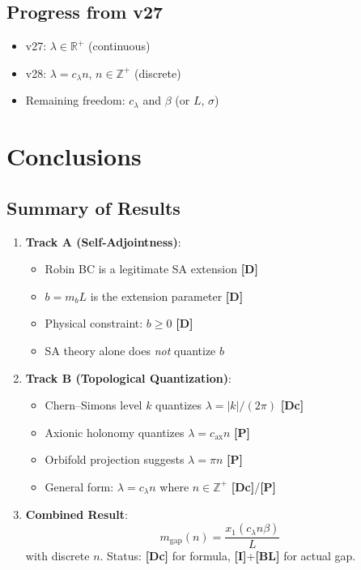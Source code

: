 \documentclass[11pt,a4paper]{article}
\newcommand{\mgap}{m_{\mathrm{gap}}}
\newcommand{\mb}{m_b}
\newcommand{\tagD}{\textbf{[D]}}
\newcommand{\tagDc}{\textbf{[Dc]}}
\newcommand{\tagI}{\textbf{[I]}}
\newcommand{\tagBL}{\textbf{[BL]}}
\newcommand{\tagP}{\textbf{[P]}}
\theoremstyle{definition}
\theoremstyle{plain}
\theoremstyle{remark}
\begin{document}
\subsection{Progress from v27}

\begin{itemize}
\item v27: $\lambda \in \mathbb{R}^+$ (continuous)
\item v28: $\lambda = c_\lambda n$, $n \in \mathbb{Z}^+$ (discrete)
\item Remaining freedom: $c_\lambda$ and $\beta$ (or $L$, $\sigma$)
\end{itemize}

\section{Conclusions}
\label{sec:conclusions}

\subsection{Summary of Results}

\begin{enumerate}
\item \textbf{Track A (Self-Adjointness)}:
\begin{itemize}
\item Robin BC is a legitimate SA extension \tagD{}
\item $b = \mb L$ is the extension parameter \tagD{}
\item Physical constraint: $b \geq 0$ \tagD{}
\item SA theory alone does \emph{not} quantize $b$
\end{itemize}

\item \textbf{Track B (Topological Quantization)}:
\begin{itemize}
\item Chern--Simons level $k$ quantizes $\lambda = |k|/(2\pi)$ \tagDc{}
\item Axionic holonomy quantizes $\lambda = c_{\mathrm{ax}} n$ \tagP{}
\item Orbifold projection suggests $\lambda = \pi n$ \tagP{}
\item General form: $\lambda = c_\lambda n$ where $n \in \mathbb{Z}^+$ \tagDc{}/\tagP{}
\end{itemize}

\item \textbf{Combined Result}:
\begin{equation}
\mgap(n) = \frac{x_1(c_\lambda n \beta)}{L}
\label{eq:final-gap}
\end{equation}
with discrete $n$. Status: \tagDc{} for formula, \tagI{}+\tagBL{} for actual gap.
\end{enumerate}
\end{document}
